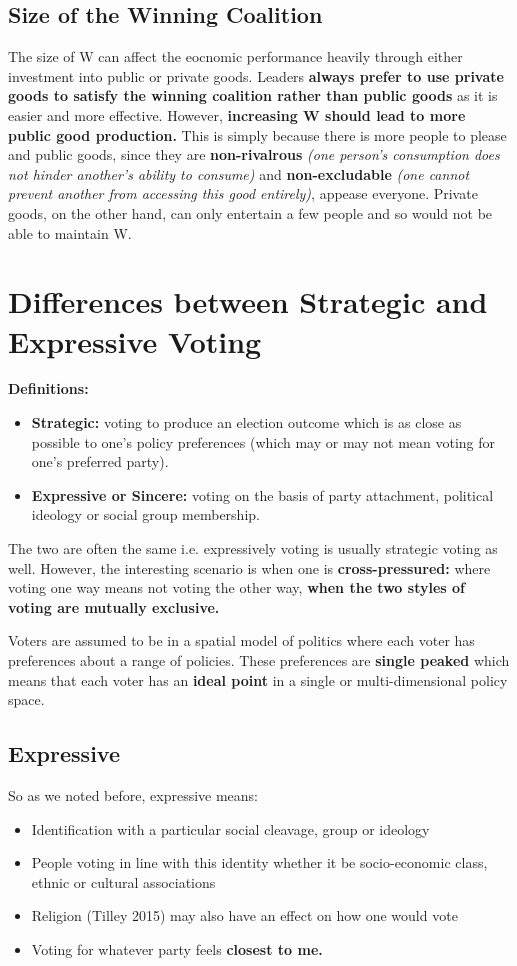 \documentclass[12pt, letterpaper]{article}
\begin{document}
\subsection{Size of the Winning Coalition}
The size of W can affect the eocnomic performance heavily through either investment into public or private goods. Leaders \textbf{always prefer to use private goods to satisfy the winning coalition rather than public goods} as it is easier and more effective. However, \textbf{increasing W should lead to more public good production.} This is simply because there is more people to please and public goods, since they are \textbf{non-rivalrous} \textit{(one person's consumption does not hinder another's ability to consume)} and \textbf{non-excludable} \textit{(one cannot prevent another from accessing this good entirely)}, appease everyone. Private goods, on the other hand, can only entertain a few people and so would not be able to maintain W.


\newpage
\section{Differences between Strategic and Expressive Voting}
\textbf{Definitions:}
\begin{itemize}
	\item \textbf{Strategic:} voting to produce an election outcome which is as close as possible to one's policy preferences (which may or may not mean voting for one's preferred party).
	\item \textbf{Expressive or Sincere:} voting on the basis of party attachment, political ideology or social group membership.
\end{itemize}

The two are often the same i.e. expressively voting is usually strategic voting as well. However, the interesting scenario is when one is \textbf{cross-pressured:} where voting one way means not voting the other way, \textbf{when the two styles of voting are mutually exclusive.}

Voters are assumed to be in a spatial model of politics where each voter has preferences about a range of policies. These preferences are \textbf{single peaked} which means that each voter has an \textbf{ideal point} in a single or multi-dimensional policy space.

\subsection{Expressive}
So as we noted before, expressive means:
\begin{itemize}
	\item Identification with a particular social cleavage, group or ideology
	\item People voting in line with this identity whether it be socio-economic class, ethnic or cultural associations
	\item Religion (Tilley 2015) may also have an effect on how one would vote
	\item Voting for whatever party feels \textbf{closest to me.}
\end{itemize}
\end{document}

